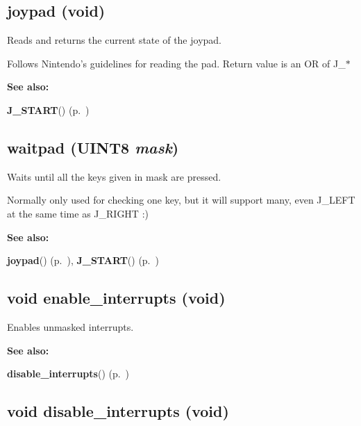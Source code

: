 \subsection{ joypad (void)}

Reads and returns the current state of the joypad.

Follows Nintendo's guidelines for reading the pad. Return value is an OR of J\_\-$\ast$ \begin{Desc}
\item[{\bf See also: }]\par
{\bf J\_\-START}() {\rm (p.~\pageref{gb.h_a0})} \end{Desc}
\label{gb.h_a69}
\subsection{ waitpad ({\bf UINT8} {\em mask})}

Waits until all the keys given in mask are pressed.

Normally only used for checking one key, but it will support many, even J\_\-LEFT at the same time as J\_\-RIGHT :) \begin{Desc}
\item[{\bf See also: }]\par
{\bf joypad}() {\rm (p.~\pageref{gb.h_a68})}, {\bf J\_\-START}() {\rm (p.~\pageref{gb.h_a0})} \end{Desc}
\label{gb.h_a71}
\subsection{\setlength{\rightskip}{0pt plus 5cm}void enable\_\-interrupts (void)}

Enables unmasked interrupts.

\begin{Desc}
\item[{\bf See also: }]\par
{\bf disable\_\-interrupts}() {\rm (p.~\pageref{gb.h_a72})} \end{Desc}
\label{gb.h_a72}
\subsection{\setlength{\rightskip}{0pt plus 5cm}void disable\_\-interrupts (void)}

